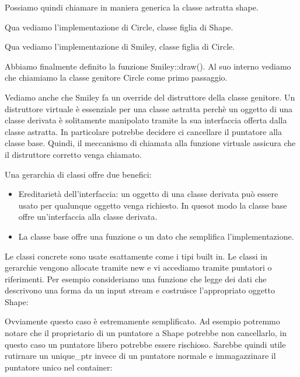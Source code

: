 \documentclass[11pt,a4paper]{book}
\begin{document}
\label{code: 034}
Possiamo quindi chiamare in maniera generica la classe astratta shape.

\label{code: 035}
Qua vediamo l'implementazione di Circle, classe figlia di Shape.

\label{code: 036}
Qua vediamo l'implementazione di Smiley, classe figlia di Circle.

\label{code: 037}
Abbiamo finalmente definito la funzione Smiley::draw(). Al suo interno vediamo che chiamiamo la classe genitore Circle come primo passaggio.

Vediamo anche che Smiley fa un override del distruttore della classe genitore. Un distruttore virtuale è essenziale per una classe astratta perchè un oggetto di una classe derivata è solitamente manipolato tramite la sua interfaccia offerta dalla classe astratta. In particolare potrebbe decidere ci cancellare il puntatore alla classe base. Quindi, il meccanismo di chiamata alla funzione virtuale assicura che il distruttore corretto venga chiamato.

Una gerarchia di classi offre due benefici:
\begin{itemize}
	\item Ereditarietà dell'interfaccia: un oggetto di una classe derivata può essere usato per qualunque oggetto venga richiesto. In quesot modo la classe base offre un'interfaccia alla classe derivata.
	\item La classe base offre una funzione o un dato che semplifica l'implementazione.
\end{itemize}

Le classi concrete sono usate esattamente come i tipi built in. Le classi in gerarchie vengono allocate tramite new e vi accediamo tramite puntatori o riferimenti. Per esempio consideriamo una funzione che legge dei dati che descrivono una forma da un input stream e costruisce l'appropriato oggetto Shape:
\label{code: 038}
\label{code: 039}

Ovviamente questo caso è estremamente semplificato. Ad esempio potremmo notare che il proprietario di un puntatore a Shape potrebbe non cancellarlo, in questo caso un puntatore libero potrebbe essere rischioso. Sarebbe quindi utile rutirnare un unique\_ptr invece di un puntatore normale e immagazzinare il puntatore unico nel container:
\label{code: 040}
\end{document}
